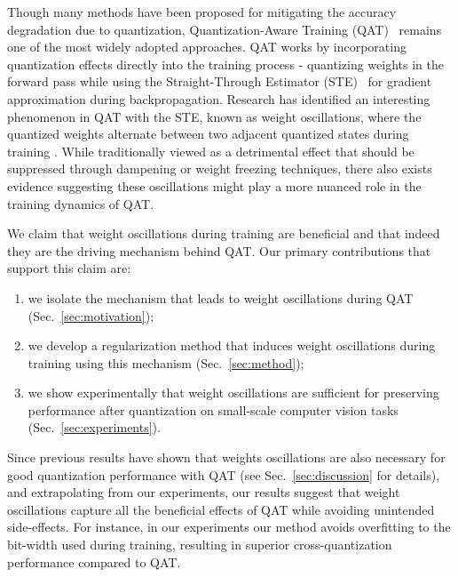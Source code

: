 Though many methods have been proposed for mitigating the accuracy degradation due to quantization, Quantization-Aware Training (QAT)~\cite{jacob2017quantization} remains one of the most widely adopted approaches. QAT works by incorporating quantization effects directly into the training process - quantizing weights in the forward pass while using the Straight-Through Estimator (STE)~\cite{bengio2013ste} for gradient approximation during backpropagation. Research has identified an interesting phenomenon in QAT with the STE, known as weight oscillations, where the quantized weights alternate between two adjacent quantized states during training \cite{pseudoQuantNoise, nagel2022overcoming}. While traditionally viewed as a detrimental effect that should be suppressed through dampening or weight freezing techniques, there also exists evidence suggesting these oscillations might play a more nuanced role in the training dynamics of QAT.




We claim that weight oscillations during training are beneficial and that indeed they are the driving mechanism behind QAT. Our primary contributions that support this claim are:
\begin{enumerate}
   \item we isolate the mechanism that leads to weight oscillations during QAT (Sec.~\ref{sec:motivation});
   \item we develop a regularization method that induces weight oscillations during training using this mechanism (Sec.~\ref{sec:method});
   \item we show experimentally that weight oscillations are sufficient for preserving performance after quantization on small-scale computer vision tasks (Sec.~\ref{sec:experiments}).
\end{enumerate}

Since previous results have shown that weights oscillations are also necessary for good quantization performance with QAT (see Sec.~\ref{sec:discussion} for details), and extrapolating from our experiments, our results suggest that weight oscillations capture all the beneficial effects of QAT while avoiding unintended side-effects. For instance, in our experiments our method avoids overfitting to the bit-width used during training, resulting in superior cross-quantization performance compared to QAT.

